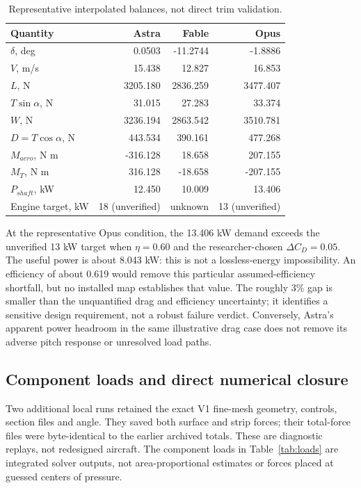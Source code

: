 \documentclass[11pt,a4paper]{article}
\begin{document}
\begin{table}[H]\centering\small
\caption{Representative interpolated balances, not direct trim validation.}\label{tab:interpolated}
\begin{tabular}{lrrr}\toprule
Quantity & Astra & Fable & Opus\\\midrule
$\delta$, deg &0.0503&-11.2744&-1.8886\\
$V$, m/s &15.438&12.827&16.853\\
$L$, N &3205.180&2836.259&3477.407\\
$T\sin\alpha$, N &31.015&27.283&33.374\\
$W$, N &3236.194&2863.542&3510.781\\
$D=T\cos\alpha$, N &443.534&390.161&477.268\\
$M_{aero}$, N m &-316.128&18.658&207.155\\
$M_T$, N m &316.128&-18.658&-207.155\\
$P_{shaft}$, kW &12.450&10.009&13.406\\
Engine target, kW &18 (unverified)&unknown&13 (unverified)\\\bottomrule
\end{tabular}
\end{table}



At the representative Opus condition, the 13.406 kW demand exceeds the unverified 13 kW target when $\eta=0.60$ and the researcher-chosen $\Delta C_D=0.05$. The useful power is about 8.043 kW: this is not a lossless-energy impossibility. An efficiency of about 0.619 would remove this particular assumed-efficiency shortfall, but no installed map establishes that value. The roughly 3\% gap is smaller than the unquantified drag and efficiency uncertainty; it identifies a sensitive design requirement, not a robust failure verdict. Conversely, Astra's apparent power headroom in the same illustrative drag case does not remove its adverse pitch response or unresolved load paths.

\subsection{Component loads and direct numerical closure}
Two additional local runs retained the exact V1 fine-mesh geometry, controls, section files and angle. They saved both surface and strip forces; their total-force files were byte-identical to the earlier archived totals. These are diagnostic replays, not redesigned aircraft. The component loads in Table~\ref{tab:loads} are integrated solver outputs, not area-proportional estimates or forces placed at guessed centers of pressure.
\end{document}
